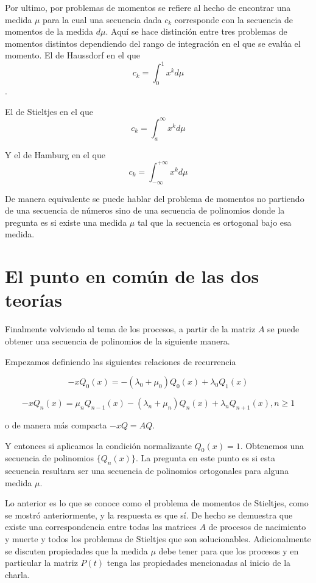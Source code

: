 \documentclass[letter,twoside,12pt]{article}
\numberwithin{equation}{section}
\begin{document}
Por ultimo, por problemas de momentos se refiere al hecho de encontrar una medida $ \mu $ para la cual una secuencia dada $c_k$ corresponde con la secuencia de momentos de la medida $d\mu$. Aquí se hace distinción entre tres problemas de momentos distintos dependiendo del rango de integración en el que se evalúa el momento. El de Haussdorf
en el que 
$$ c_k = \int_0^1 x^kd\mu   $$.

El de Stieltjes en el que $$ c_k = \int_a^\infty x^kd\mu   $$

Y el de Hamburg en el que $$ c_k = \int_{-\infty}^{+\infty} x^kd\mu   $$

De manera equivalente se puede hablar del problema de momentos no partiendo de una secuencia de números sino de una secuencia de polinomios donde la pregunta es si existe una medida $\mu$ tal que la secuencia es ortogonal bajo esa medida.

\section{El punto en común de las dos teorías}

Finalmente volviendo al tema de los procesos, a partir de la matriz $A$ se puede obtener una secuencia de polinomios de la siguiente manera.

Empezamos definiendo las siguientes relaciones de recurrencia 

$$ -xQ_0(x) = -(\lambda_0 + \mu_0)Q_0(x) + \lambda_0Q_1(x) $$

$$ -xQ_n(x) = \mu_nQ_{n-1}(x) -(\lambda_n + \mu_n)Q_n(x) + \lambda_nQ_{n+1}(x), n \geq 1 $$

o de manera más compacta $ -xQ = AQ $.

Y entonces si aplicamos la condición normalizante $ Q_0(x)=1 $. Obtenemos una secuencia de polinomios $ \{Q_n(x)\} $. La pregunta en este punto es si esta secuencia resultara ser una secuencia de polinomios ortogonales para alguna medida $ \mu $.

Lo anterior es lo que se conoce como el problema de momentos de Stieltjes, como se mostró anteriormente, y la respuesta es que sí. De hecho se demuestra que existe una correspondencia entre todas las matrices $A$ de procesos de nacimiento y muerte y todos los problemas de Stieltjes que son solucionables. Adicionalmente se discuten propiedades que la medida $\mu$ debe tener para que los procesos y en particular la matriz $ P(t) $ tenga las propiedades mencionadas al inicio de la charla.

\end{document}
